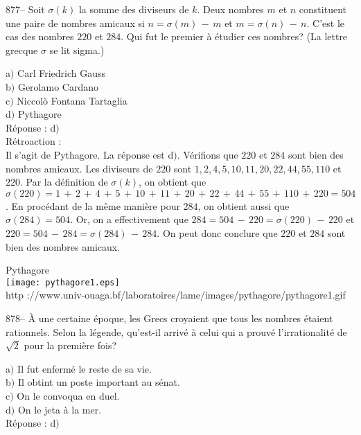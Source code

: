 ﻿\documentclass[letterpaper, 12pt]{article}
\begin{document}
877-- Soit $\sigma(k)$ la somme des diviseurs de $k$. Deux nombres
$m$ et $n$ constituent une paire de nombres amicaux si
$n=\sigma(m)\,-\,m$ et $m=\sigma(n)\,-\,n$. C'est le cas des nombres
$220$ et $284$. Qui fut le premier \`a \'etudier ces nombres? (La
lettre grecque $\sigma$ se lit sigma.)

a$)$ Carl Friedrich Gauss \\
b$)$ Gerolamo Cardano \\
c$)$ Niccol\`o Fontana Tartaglia\\
d$)$ Pythagore \\

R\'eponse : d$)$\\

R\'etroaction :\\
Il s'agit de Pythagore. La r\'eponse est d$)$. V\'erifions que $220$
et $284$ sont bien des nombres amicaux. Les diviseurs de $220$ sont
$1,2,4,5,10,11,20,22,44,55,110$ et $220$. Par la d\'efinition de
$\sigma(k)$, on obtient que
$\sigma(220)=1\,+\,2\,+\,4\,+\,5\,+\,10\,+\,11\,+\,20\,+\,22\,+\,44\,+\,55\,+\,110\,+\,220=504$.
En proc\'edant de la m\^eme mani\`ere pour $284$, on obtient aussi
que $\sigma(284)=504$. Or, on a effectivement que
$284=504\,-\,220=\sigma(220)\,-\,220$ et
$220=504\,-\,284=\sigma(284)\,-\,284$. On peut donc conclure
que $220$ et $284$ sont bien des nombres amicaux. \\

        \begin{center}
        Pythagore\\
    \texttt{[image: pythagore1.eps]}\\
        {\footnotesize http
://www.univ-ouaga.bf/laboratoires/lame/images/pythagore/pythagore1.gif}
    \end{center}

878-- \`A une certaine \'epoque, les Grecs croyaient que tous les
nombres \'etaient rationnels. Selon la l\'egende, qu'est-il arriv\'e
\`a celui qui a prouv\'e l'irrationalit\'e de $\sqrt2$ pour la
premi\`ere fois?

a$)$ Il fut enferm\'e le reste de sa vie. \\
b$)$ Il obtint un poste important au s\'enat. \\
c$)$ On le convoqua en duel. \\
d$)$ On le jeta \`a la mer.\\

R\'eponse : d$)$\\
\end{document}

